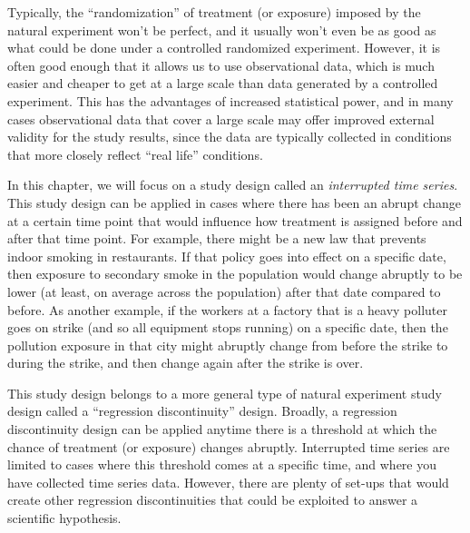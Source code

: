 \documentclass[
]{book}
\begin{document}
Typically, the ``randomization'' of treatment (or exposure) imposed by the natural experiment won't be perfect, and it usually won't even be as good as what could be done under a controlled randomized experiment. However, it is often good enough that it allows us to use observational data, which is much easier and cheaper to get at a large scale than data generated by a controlled experiment. This has the advantages of increased statistical power, and in many cases observational data that cover a large scale may offer improved external validity for the study results, since the data are typically collected in conditions that more closely reflect ``real life'' conditions.

In this chapter, we will focus on a study design called an \emph{interrupted time series}. This study design can be applied in cases where there has been an abrupt change at a certain time point that would influence how treatment is assigned before and after that time point. For example, there might be a new law that prevents indoor smoking in restaurants. If that policy goes into effect on a specific date, then exposure to secondary smoke in the population would change abruptly to be lower (at least, on average across the population) after that date compared to before. As another example, if the workers at a factory that is a heavy polluter goes on strike (and so all equipment stops running) on a specific date, then the pollution exposure in that city might abruptly change from before the strike to during the strike, and then change again after the strike is over.

This study design belongs to a more general type of natural experiment study design called a ``regression discontinuity'' design. Broadly, a regression discontinuity design can be applied anytime there is a threshold at which the chance of treatment (or exposure) changes abruptly. Interrupted time series are limited to cases where this threshold comes at a specific time, and where you have collected time series data. However, there are plenty of set-ups that would create other regression discontinuities that could be exploited to answer a scientific hypothesis.
\end{document}
